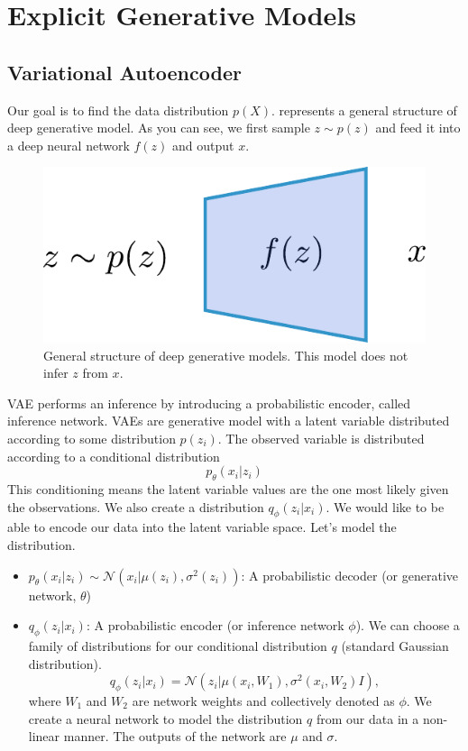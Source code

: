 \chapter{Explicit Generative Models}
\section{Variational Autoencoder}

Our goal is to find the data distribution $p(X)$.  represents a general structure of deep generative model. As you can see, we first sample $z\sim p(z)$ and feed it into a deep neural network $f(z)$ and output $x$.

\begin{figure}[h]
	\begin{center}
		\includegraphics[scale=0.5]{./images/generative/dgm.pdf}
	\end{center}
	\caption{General structure of deep generative models. This model does not infer $z$ from $x$.}
	\label{fig:dgm}
\end{figure}

VAE performs an inference by introducing a probabilistic encoder, called inference network. VAEs are generative model with a latent variable distributed according to some distribution $p(z_i)$. The observed variable is distributed according to a conditional distribution 
$$p_\theta(x_i|z_i)$$
This conditioning means the latent variable values are the one most likely given the observations. We also create a distribution $q_\phi(z_i|x_i)$. We would like to be able to encode our data into the latent variable space. Let's model the distribution.

\begin{itemize}
	\item $p_\theta(x_i|z_i)\sim \mathcal{N}(x_{i}|\mu(z_i), \sigma^2(z_i))$: A probabilistic decoder (or generative network, $\theta$)
	\item $q_\phi(z_i|x_i)$: A probabilistic encoder (or inference network $\phi$). We can choose a family of distributions for our conditional distribution $q$ (\eg standard Gaussian distribution). 
		$$q_\phi(z_i|x_i) = \mathcal{N}(z_i|\mu(x_i, W_1), \sigma^2(x_i, W_2)I),$$
	where $W_1$ and $W_2$ are network weights and collectively denoted as $\phi$. We create a neural network to model the distribution $q$ from our data in a non-linear manner. The outputs of the network are $\mu$ and $\sigma$. 
\end{itemize}

